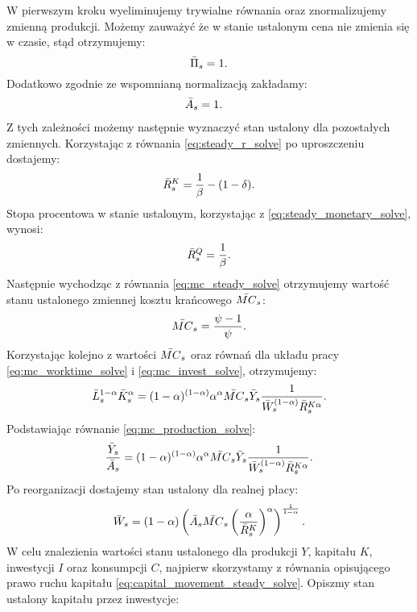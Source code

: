 W pierwszym kroku wyeliminujemy trywialne równania oraz znormalizujemy zmienną produkcji. Możemy zauważyć że w stanie ustalonym cena nie zmienia się w czasie, stąd otrzymujemy:
\begin{equation}
    \bar{\Pi}_s = 1.
\end{equation}
Dodatkowo zgodnie ze wspomnianą normalizacją zakładamy:
\begin{align}
    \bar{A}_s &= 1.
\end{align}
Z tych zależności możemy następnie wyznaczyć stan ustalony dla pozostałych zmiennych. Korzystając z równania \eqref{eq:steady_r_solve} po uproszczeniu dostajemy:
\begin{equation}
    \bar{R}_s^K = \frac{1}{\beta} - (1 - \delta).
\end{equation}
Stopa procentowa w stanie ustalonym, korzystając z \eqref{eq:steady_monetary_solve}, wynosi:
\begin{equation}
    \bar{R}_s^Q = \frac{1}{\beta}.
\end{equation}
Następnie wychodząc z równania \eqref{eq:mc_steady_solve} otrzymujemy wartość stanu ustalonego zmiennej kosztu krańcowego $\bar{MC}_s$:
\begin{equation}
    \bar{MC}_s = \frac{\psi - 1}{\psi}.
\end{equation}
Korzystając kolejno z wartości $\bar{MC}_s$ oraz równań dla układu pracy \eqref{eq:mc_worktime_solve} i \eqref{eq:mc_invest_solve}, otrzymujemy:
\begin{equation}
    \bar{L}_s^{1-\alpha}\bar{K}_s^\alpha = (1-\alpha)^{(1-\alpha)} \alpha^\alpha \bar{MC}_s \bar{Y}_s \frac{1}{\bar{W}_s^{(1-\alpha)} \bar{R}_s^{K\alpha}}.
\end{equation}
Podstawiając równanie \eqref{eq:mc_production_solve}:
\begin{equation}
    \frac{\bar{Y}_s}{\bar{A}_s} = (1-\alpha)^{(1-\alpha)} \alpha^\alpha \bar{MC}_s \bar{Y}_s \frac{1}{\bar{W}_s^{(1-\alpha)} \bar{R}_s^{K\alpha}}.
\end{equation}
Po reorganizacji dostajemy stan ustalony dla realnej płacy:
\begin{equation}
    \bar{W}_s = (1-\alpha)\left(\bar{A}_s \bar{MC}_s \left(\frac{\alpha}{\bar{R}_s^{K}}\right)^\alpha\right)^{\frac{1}{1-\alpha}}.
\end{equation}
W celu znalezienia wartości stanu ustalonego dla produkcji $Y$, kapitału $K$, inwestycji $I$ oraz konsumpcji $C$, najpierw skorzystamy z równania opisującego prawo ruchu kapitału \eqref{eq:capital_movement_steady_solve}. Opiszmy stan ustalony kapitału przez inwestycje:
